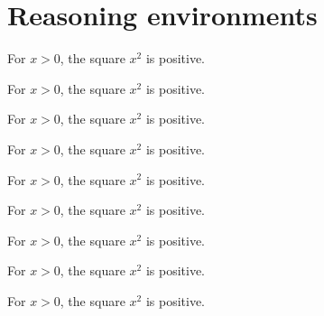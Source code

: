 \clearpage
\section{Reasoning environments}
\begin{theorem}
\label{theorem:demo}
For $x>0$, the square $x^2$ is positive.
\end{theorem}
\begin{lemma}
\label{lemma:demo}
For $x>0$, the square $x^2$ is positive.
\end{lemma}
\begin{corollary}
\label{corollary:demo}
For $x>0$, the square $x^2$ is positive.
\end{corollary}
\begin{proposition}
\label{proposition:demo}
For $x>0$, the square $x^2$ is positive.
\end{proposition}
\begin{conjecture}
\label{conjecture:demo}
For $x>0$, the square $x^2$ is positive.
\end{conjecture}
\begin{algorithm}
\label{algorithm:demo}
For $x>0$, the square $x^2$ is positive.
\end{algorithm}
\begin{definition}
\label{definition:demo}
For $x>0$, the square $x^2$ is positive.
\end{definition}
\begin{example}
\label{example:demo}
For $x>0$, the square $x^2$ is positive.
\end{example}
\begin{remark}
\label{remark:demo}
For $x>0$, the square $x^2$ is positive.
\end{remark}
